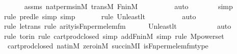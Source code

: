 \begin{isabellebody}
\ \ \ \ \isamarkupfalse%
\ assms\ nat{\isacharunderscore}{\kern0pt}perms{\isacharunderscore}{\kern0pt}in{\isacharunderscore}{\kern0pt}M\ transM\ Fn{\isacharunderscore}{\kern0pt}in{\isacharunderscore}{\kern0pt}M\isanewline
\ \ \ \ \ \ \ \ \isamarkupfalse%
\ auto{\isacharbrackleft}{\kern0pt}{}{\isacharbrackright}{\kern0pt}\isanewline
\ \ \ \ \ \ \isamarkupfalse%
\ simp\isanewline
\ \ \ \ \ \ \isamarkupfalse%
{\isacharparenleft}{\kern0pt}rule\ pred{\isacharunderscore}{\kern0pt}le{\isacharcomma}{\kern0pt}\ simp{\isacharcomma}{\kern0pt}\ simp{\isacharparenright}{\kern0pt}\isanewline
\ \ \ \ \ \ \isamarkupfalse%
{\isacharparenleft}{\kern0pt}rule\ Un{\isacharunderscore}{\kern0pt}least{\isacharunderscore}{\kern0pt}lt{\isacharparenright}{\kern0pt}{\isacharplus}{\kern0pt}\isanewline
\ \ \ \ \ \ \ \ \isamarkupfalse%
\ auto{\isacharbrackleft}{\kern0pt}{}{\isacharbrackright}{\kern0pt}\isanewline
\ \ \ \ \ \ \isamarkupfalse%
{\isacharparenleft}{\kern0pt}rule\ le{\isacharunderscore}{\kern0pt}trans{\isacharcomma}{\kern0pt}\ rule\ arity{\isacharunderscore}{\kern0pt}is{\isacharunderscore}{\kern0pt}Fn{\isacharunderscore}{\kern0pt}perm{\isacharprime}{\kern0pt}{\isacharunderscore}{\kern0pt}elem{\isacharunderscore}{\kern0pt}fm{\isacharparenright}{\kern0pt}\isanewline
\ \ \ \ \isamarkupfalse%
\ Un{\isacharunderscore}{\kern0pt}least{\isacharunderscore}{\kern0pt}lt\isanewline
\ \ \ \ \ \ \ \ \ \isamarkupfalse%
\ auto{\isacharbrackleft}{\kern0pt}{}{\isacharbrackright}{\kern0pt}\isanewline
\ \ \ \ \ \isamarkupfalse%
{\isacharparenleft}{\kern0pt}rule\ to{\isacharunderscore}{\kern0pt}rin{\isacharcomma}{\kern0pt}\ rule\ cartprod{\isacharunderscore}{\kern0pt}closed{\isacharcomma}{\kern0pt}\ simp\ add{\isacharcolon}{\kern0pt}Fn{\isacharunderscore}{\kern0pt}in{\isacharunderscore}{\kern0pt}M{\isacharcomma}{\kern0pt}\ simp{\isacharcomma}{\kern0pt}\ rule\ M{\isacharunderscore}{\kern0pt}powerset{\isacharparenright}{\kern0pt}\isanewline
\ \ \ \ \isamarkupfalse%
\ cartprod{\isacharunderscore}{\kern0pt}closed\ nat{\isacharunderscore}{\kern0pt}in{\isacharunderscore}{\kern0pt}M\ zero{\isacharunderscore}{\kern0pt}in{\isacharunderscore}{\kern0pt}M\ succ{\isacharunderscore}{\kern0pt}in{\isacharunderscore}{\kern0pt}MI\ is{\isacharunderscore}{\kern0pt}Fn{\isacharunderscore}{\kern0pt}perm{\isacharprime}{\kern0pt}{\isacharunderscore}{\kern0pt}elem{\isacharunderscore}{\kern0pt}fm{\isacharunderscore}{\kern0pt}type\isanewline

\end{isabellebody}
